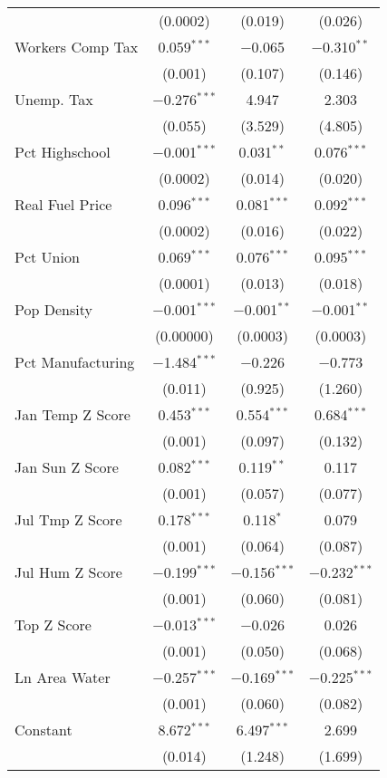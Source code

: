 \begin{table}[!htbp]
\begin{tabular}{@{\extracolsep{5pt}}lccc}
  & (0.0002) & (0.019) & (0.026) \\ 
  Workers Comp Tax & 0.059$^{***}$ & $-$0.065 & $-$0.310$^{**}$ \\ 
  & (0.001) & (0.107) & (0.146) \\ 
  Unemp. Tax & $-$0.276$^{***}$ & 4.947 & 2.303 \\ 
  & (0.055) & (3.529) & (4.805) \\ 
  Pct Highschool & $-$0.001$^{***}$ & 0.031$^{**}$ & 0.076$^{***}$ \\ 
  & (0.0002) & (0.014) & (0.020) \\ 
  Real Fuel Price & 0.096$^{***}$ & 0.081$^{***}$ & 0.092$^{***}$ \\ 
  & (0.0002) & (0.016) & (0.022) \\ 
  Pct Union & 0.069$^{***}$ & 0.076$^{***}$ & 0.095$^{***}$ \\ 
  & (0.0001) & (0.013) & (0.018) \\ 
  Pop Density & $-$0.001$^{***}$ & $-$0.001$^{**}$ & $-$0.001$^{**}$ \\ 
  & (0.00000) & (0.0003) & (0.0003) \\ 
  Pct Manufacturing & $-$1.484$^{***}$ & $-$0.226 & $-$0.773 \\ 
  & (0.011) & (0.925) & (1.260) \\ 
  Jan Temp Z Score & 0.453$^{***}$ & 0.554$^{***}$ & 0.684$^{***}$ \\ 
  & (0.001) & (0.097) & (0.132) \\ 
  Jan Sun Z Score & 0.082$^{***}$ & 0.119$^{**}$ & 0.117 \\ 
  & (0.001) & (0.057) & (0.077) \\ 
  Jul Tmp Z Score & 0.178$^{***}$ & 0.118$^{*}$ & 0.079 \\ 
  & (0.001) & (0.064) & (0.087) \\ 
  Jul Hum Z Score & $-$0.199$^{***}$ & $-$0.156$^{***}$ & $-$0.232$^{***}$ \\ 
  & (0.001) & (0.060) & (0.081) \\ 
  Top Z Score & $-$0.013$^{***}$ & $-$0.026 & 0.026 \\ 
  & (0.001) & (0.050) & (0.068) \\ 
  Ln Area Water & $-$0.257$^{***}$ & $-$0.169$^{***}$ & $-$0.225$^{***}$ \\ 
  & (0.001) & (0.060) & (0.082) \\ 
  Constant & 8.672$^{***}$ & 6.497$^{***}$ & 2.699 \\ 
  & (0.014) & (1.248) & (1.699) \\ 

\end{tabular}
\end{table}
